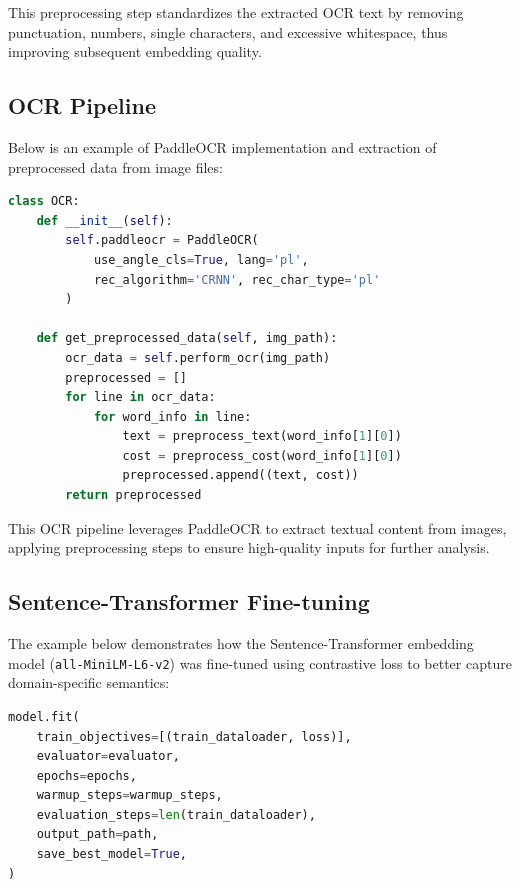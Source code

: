 \documentclass{SGGW-thesis-EN}
\begin{document}
This preprocessing step standardizes the extracted OCR text by removing punctuation, numbers, single characters, and excessive whitespace, thus improving subsequent embedding quality.

\subsection{OCR Pipeline}

Below is an example of PaddleOCR implementation and extraction of preprocessed data from image files:

\begin{lstlisting}[language=Python, caption={OCR class}, label={lst:ocr}]
class OCR:
    def __init__(self):
        self.paddleocr = PaddleOCR(
            use_angle_cls=True, lang='pl',
            rec_algorithm='CRNN', rec_char_type='pl'
        )

    def get_preprocessed_data(self, img_path):
        ocr_data = self.perform_ocr(img_path)
        preprocessed = []
        for line in ocr_data:
            for word_info in line:
                text = preprocess_text(word_info[1][0])
                cost = preprocess_cost(word_info[1][0])
                preprocessed.append((text, cost))
        return preprocessed
\end{lstlisting}
\label{code:ocr_pipeline_example}

This OCR pipeline leverages PaddleOCR to extract textual content from images, applying preprocessing steps to ensure high-quality inputs for further analysis.

\subsection{Sentence-Transformer Fine-tuning}

The example below demonstrates how the Sentence-Transformer embedding model (\texttt{all-MiniLM-L6-v2}) was fine-tuned using contrastive loss to better capture domain-specific semantics:

\begin{lstlisting}[language=Python, caption={Fine-tuning Sentence-Transformer embeddings}, label={lst:embedding_finetuning}]
model.fit(
    train_objectives=[(train_dataloader, loss)],
    evaluator=evaluator,
    epochs=epochs,
    warmup_steps=warmup_steps,
    evaluation_steps=len(train_dataloader),
    output_path=path,
    save_best_model=True,
)
\end{lstlisting}
\label{code:finetuning_example}
\end{document}
